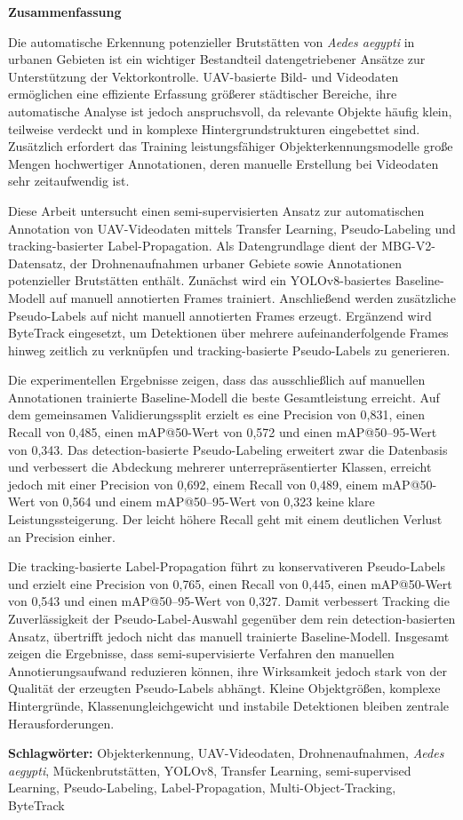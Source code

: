 \clearpage
\thispagestyle{empty}

\begin{center}
    {\Large \textbf{Zusammenfassung}}
\end{center}

\vspace{0.8cm}

\noindent Die automatische Erkennung potenzieller Brutstätten von \textit{Aedes aegypti} in urbanen Gebieten ist ein wichtiger Bestandteil datengetriebener Ansätze zur Unterstützung der Vektorkontrolle. UAV-basierte Bild- und Videodaten ermöglichen eine effiziente Erfassung größerer städtischer Bereiche, ihre automatische Analyse ist jedoch anspruchsvoll, da relevante Objekte häufig klein, teilweise verdeckt und in komplexe Hintergrundstrukturen eingebettet sind. Zusätzlich erfordert das Training leistungsfähiger Objekterkennungsmodelle große Mengen hochwertiger Annotationen, deren manuelle Erstellung bei Videodaten sehr zeitaufwendig ist.

Diese Arbeit untersucht einen semi-supervisierten Ansatz zur automatischen Annotation von UAV-Videodaten mittels Transfer Learning, Pseudo-Labeling und tracking-basierter Label-Propagation. Als Datengrundlage dient der MBG-V2-Datensatz, der Drohnenaufnahmen urbaner Gebiete sowie Annotationen potenzieller Brutstätten enthält. Zunächst wird ein YOLOv8-basiertes Baseline-Modell auf manuell annotierten Frames trainiert. Anschließend werden zusätzliche Pseudo-Labels auf nicht manuell annotierten Frames erzeugt. Ergänzend wird ByteTrack eingesetzt, um Detektionen über mehrere aufeinanderfolgende Frames hinweg zeitlich zu verknüpfen und tracking-basierte Pseudo-Labels zu generieren.

Die experimentellen Ergebnisse zeigen, dass das ausschließlich auf manuellen Annotationen trainierte Baseline-Modell die beste Gesamtleistung erreicht. Auf dem gemeinsamen Validierungssplit erzielt es eine Precision von 0{,}831, einen Recall von 0{,}485, einen mAP@50-Wert von 0{,}572 und einen mAP@50--95-Wert von 0{,}343. Das detection-basierte Pseudo-Labeling erweitert zwar die Datenbasis und verbessert die Abdeckung mehrerer unterrepräsentierter Klassen, erreicht jedoch mit einer Precision von 0{,}692, einem Recall von 0{,}489, einem mAP@50-Wert von 0{,}564 und einem mAP@50--95-Wert von 0{,}323 keine klare Leistungssteigerung. Der leicht höhere Recall geht mit einem deutlichen Verlust an Precision einher.

Die tracking-basierte Label-Propagation führt zu konservativeren Pseudo-Labels und erzielt eine Precision von 0{,}765, einen Recall von 0{,}445, einen mAP@50-Wert von 0{,}543 und einen mAP@50--95-Wert von 0{,}327. Damit verbessert Tracking die Zuverlässigkeit der Pseudo-Label-Auswahl gegenüber dem rein detection-basierten Ansatz, übertrifft jedoch nicht das manuell trainierte Baseline-Modell. Insgesamt zeigen die Ergebnisse, dass semi-supervisierte Verfahren den manuellen Annotierungsaufwand reduzieren können, ihre Wirksamkeit jedoch stark von der Qualität der erzeugten Pseudo-Labels abhängt. Kleine Objektgrößen, komplexe Hintergründe, Klassenungleichgewicht und instabile Detektionen bleiben zentrale Herausforderungen.

\vfill

\noindent\textbf{Schlagwörter:} Objekterkennung, UAV-Videodaten, Drohnenaufnahmen, \textit{Aedes aegypti}, Mückenbrutstätten, YOLOv8, Transfer Learning, semi-supervised Learning, Pseudo-Labeling, Label-Propagation, Multi-Object-Tracking, ByteTrack

\newpage